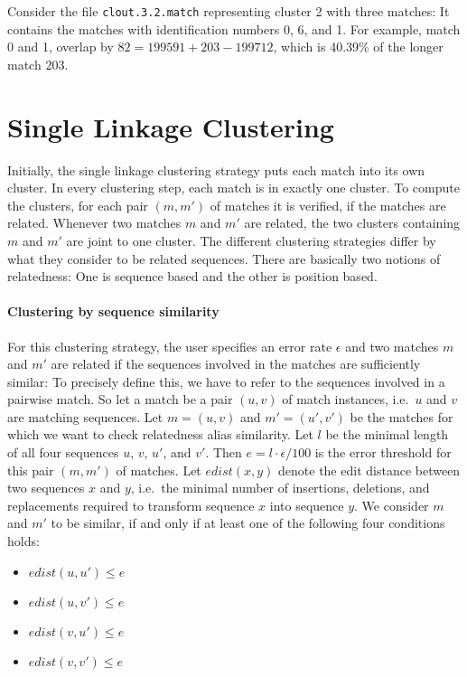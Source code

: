 \documentclass[12pt]{article}
\newcommand{\Edist}[2]{edist(#1,#2)}
\newcommand{\EXECUTE}[1]{}
\begin{document}
\EXECUTE{matchcluster -overlap 10 -outprefix clout ychrIII-100.match}

Consider the file \texttt{clout.3.2.match} representing cluster 2
with three matches: It contains the matches with identification
numbers 0, 6, and 1. For example, match 0 and 1, overlap by
\(82=199591 + 203 - 199712\), which is 40.39\% of the longer
match 203.

\EXECUTE{cat clout.3.2.match}

\appendix

\section{Single Linkage Clustering}
Initially, the single linkage clustering strategy puts each match into 
its own cluster. In every clustering step, each 
match is in exactly one cluster. To compute the clusters,
for each pair \((m,m')\) of matches it is verified, if the matches are
related. Whenever two matches \(m\) and \(m'\) 
are related, the two clusters containing 
\(m\) and \(m'\) are joint to one cluster. 
The different clustering strategies differ by what they consider 
to be related sequences. There are basically two notions
of relatedness: One is sequence based and the other is position 
based.

\paragraph{Clustering by sequence similarity}
For this clustering strategy, the user specifies an error rate 
\(\epsilon\) and two matches \(m\) and \(m'\) are related
if the sequences involved in the matches
are sufficiently similar:
To precisely define this, we have to refer to the sequences involved
in a pairwise match. So let a match be a pair \((u,v)\) of match instances, 
i.e.\ \(u\) and \(v\) are matching sequences.
Let \(m=(u,v)\)  and \(m'=(u',v')\) be the matches for which we want 
to check relatedness alias similarity.
Let \(l\) be the minimal length of all four sequences
\(u\), \(v\), \(u'\), and \(v'\). Then \(e=l\cdot\epsilon/100\) is the
error threshold for this pair \((m,m')\) of matches. 
Let \(\Edist{x}{y}\) denote the edit distance between two sequences 
\(x\) and \(y\), i.e.\
the minimal number of insertions, deletions, and replacements 
required to transform sequence \(x\) into sequence \(y\).
We consider \(m\) and \(m'\) to be similar, if and only if 
at least one of the following four conditions holds:
\begin{itemize}
\item
\(\Edist{u}{u'}\leq e\)
\item
\(\Edist{u}{v'}\leq e\)
\item
\(\Edist{v}{u'}\leq e\)
\item
\(\Edist{v}{v'}\leq e\)
\end{itemize}
\end{document}
